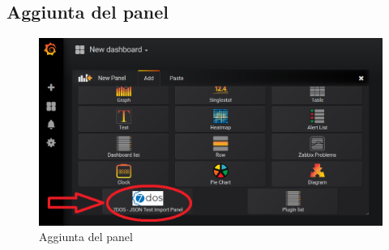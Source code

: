 \subsection{Aggiunta del panel}
\begin{figure} [H]
	\centering
	\includegraphics[scale=0.8]{Img/aggiuntapanel} 
	\caption{Aggiunta del panel} \label{Selezione } 
\end{figure} 